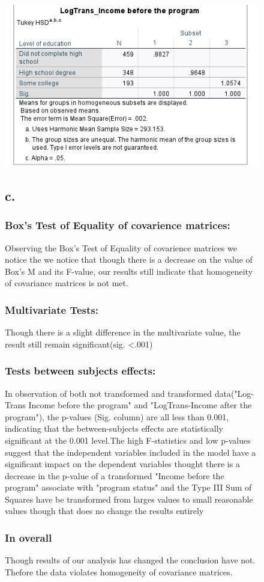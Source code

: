 \documentclass[english,10pt,a4paper]{article}
\begin{document}
					\begin{figure}[h]
			\includegraphics[width=1\linewidth]{IBPlog}
			
			\subsection*{c.}
			\subsubsection*{Box's Test of Equality of covarience matrices:}
			
			Observing the Box's Test of Equality of covarience matrices we notice the we notice that  though there is a decrease on the value of Box's M and its F-value, our results still indicate that homogeneity of covariance matrices is not met.
			
				\subsubsection*{Multivariate Tests:}
			Though there is a slight difference in the multivariate value, the result still remain significant(sig. <.001)
			
				\subsubsection*{Tests between subjects effects:}
			In observation of both not transformed and transformed data("Log-Trans Income before the program" and "LogTrans-Income after the program"), the p-values (Sig. column) are all less than 0.001, indicating that the between-subjects effects are statistically significant at the 0.001 level.The high F-statistics and low p-values suggest that the independent variables included in the model have a significant impact on the dependent variables thought there is a decrease in the p-value of a transformed "Income before the program" associate with "program status" and the Type III Sum of Squares have be transformed from larges values to small reasonable values though that does no change the results entirely
			
			\subsubsection*{In overall}
	Though results  of our analysis has changed the conclusion have not. Thefore the data violates homogeneity of covariance matrices.
			\end{figure}
\end{document}
